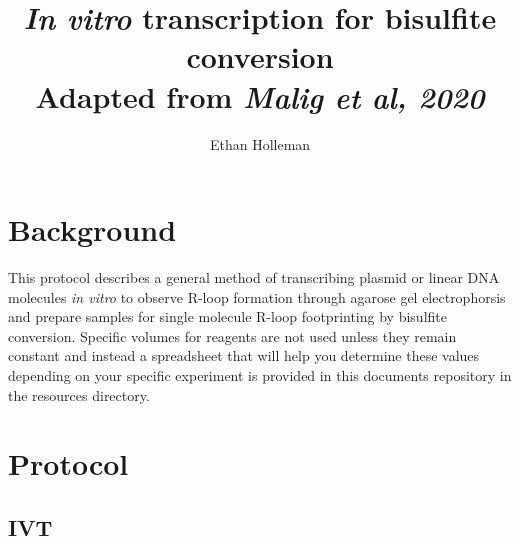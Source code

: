 \documentclass[12pt]{article}
\theoremstyle{definition}
\begin{document}
\title{
	\textbf{\emph{In vitro} transcription for bisulfite conversion}\\
	\large Adapted from \emph{Malig et al, 2020}}

\author{Ethan Holleman}
\maketitle

\section*{Background}

This protocol describes a general method of transcribing plasmid or linear DNA molecules \emph{in vitro} to observe R-loop formation through agarose gel electrophorsis and prepare samples
for single molecule R-loop footprinting by bisulfite conversion. Specific volumes for reagents are not used unless they remain
constant and instead a spreadsheet that will help you determine
these values depending on your specific experiment is provided in this documents repository in the resources directory.

\section*{Protocol}

\subsection*{IVT}
\end{document}
